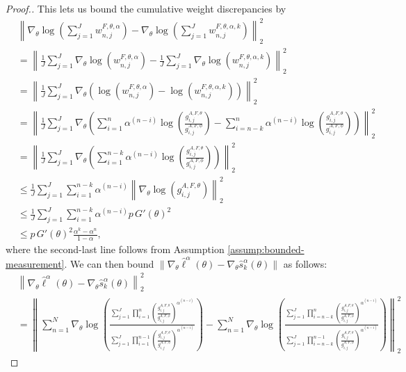 \begin{proof}[Proof.]
This lets us bound the cumulative weight discrepancies by
\begin{align}
    &  \left\lVert\nabla_\theta\log\left(\sum_{j=1}^J w_{n,j}^{F,\theta,\alpha}\right)-\nabla_\theta\log\left(\sum_{j=1}^J w_{n,j}^{F,\theta,\alpha,k}\right)\right\rVert_2^2
    \nonumber \\
    &= \left\lVert\frac{1}{J}\sum_{j=1}^J \nabla_\theta \log\left(w_{n,j}^{F,\theta,\alpha}\right)-\frac{1}{J}\sum_{j=1}^J \nabla_\theta \log\left(w_{n,j}^{F,\theta,\alpha,k}\right)\right\rVert_2^2 \\
    &= \left\lVert\frac{1}{J}\sum_{j=1}^J \nabla_\theta \left(\log\left(w_{n,j}^{F,\theta,\alpha}\right)-\log\left(w_{n,j}^{F,\theta,\alpha,k}\right)\right)\right\rVert_2^2\\
    &= \left\lVert\frac{1}{J}\sum_{j=1}^J \nabla_\theta \left(\sum_{i=1}^n\alpha^{(n-i)}\log\left(\frac{g_{i,j}^{A,F,\theta}}{g_{i,j}^{A,F,\phi}} \right) - \sum_{i=n-k}^n{\alpha^{(n-i)}}\log\left(\frac{g_{i,j}^{A,F,\theta}}{g_{i,j}^{A,F,\phi}} \right)\right)\right\rVert_2^2 \\
    &= \left\lVert\frac{1}{J}\sum_{j=1}^J \nabla_\theta \left(\sum_{i=1}^{n-k}\alpha^{(n-i)}\log\left(\frac{g_{i,j}^{A,F,\theta}}{g_{i,j}^{A,F,\phi}} \right) \right)\right\rVert_2^2\\
    &\leq \frac{1}{J}\sum_{j=1}^J \sum_{i=1}^{n-k}\alpha^{(n-i)}\left\lVert\nabla_\theta\log\left(g_{i,j}^{A,F,\theta} \right)\right\rVert_2^2\\
    &\leq \frac{1}{J}\sum_{j=1}^J \sum_{i=1}^{n-k}\alpha^{(n-i)}p \, G'(\theta)^2\\
    &\leq p \, G'(\theta)^2\frac{\alpha^k-\alpha^n}{1-\alpha},
\end{align}
where the second-last line follows from Assumption \ref{assump:bounded-measurement}.
We can then bound $\|\nabla_\theta\hat\ell^\alpha(\theta) - \nabla_\theta \hat s_k^\alpha(\theta)\|$ as follows:
{\small
\begin{align}
    &\left\lVert\nabla_\theta\hat\ell^\alpha(\theta) - \nabla_\theta \hat s_k^\alpha(\theta) \right\rVert_2^2
    \nonumber
    \\ \nonumber
    &= \left\lVert\sum_{n=1}^N \nabla_\theta \log\left(\frac{\sum_{j=1}^J\prod_{i=1}^n\left(\frac{g_{i,j}^{A,F,\theta}}{g_{i,j}^{A,F,\phi}} \right)^{\alpha^{(n-i)}}}{\sum_{j=1}^J\prod_{i=1}^{n-1}\left(\frac{g_{i,j}^{A,F,\theta}}{g_{i,j}^{A,F,\phi}} \right)^{\alpha^{(n-i)}}}\right) - \sum_{n=1}^N \nabla_\theta\log\left(\frac{\sum_{j=1}^J\prod_{i=n-k}^n\left(\frac{g_{i,j}^{A,F,\theta}}{g_{i,j}^{A,F,\phi}} \right)^{\alpha^{(n-i)}}}{\sum_{j=1}^J\prod_{i=n-k}^{n-1}\left(\frac{g_{i,j}^{A,F,\theta}}{g_{i,j}^{A,F,\phi}} \right)^{\alpha^{(n-i)}}}\right) \right\rVert_2^2

\end{align}}
\end{proof}

